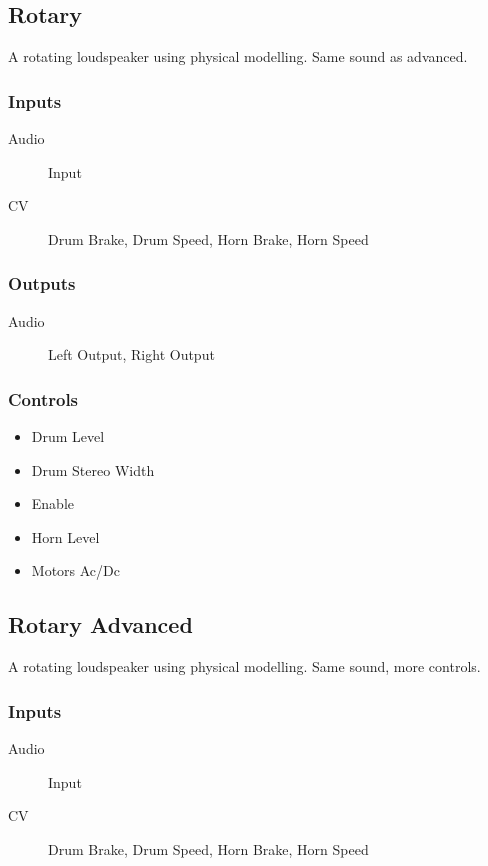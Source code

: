\subsection{Rotary}

A rotating loudspeaker using physical modelling. Same sound as advanced.



\subsubsection{Inputs}
\begin{description}
\item [Audio] Input
\item [CV] Drum Brake, Drum Speed, Horn Brake, Horn Speed
\end{description}

\subsubsection{Outputs}
\begin{description}
\item [Audio] Left Output, Right Output
\end{description}

\subsubsection{Controls}
\begin{itemize}
\item Drum Level
\item Drum Stereo Width
\item Enable
\item Horn Level
\item Motors Ac/Dc
\end{itemize}

\subsection{Rotary Advanced}

A rotating loudspeaker using physical modelling. Same sound, more controls.



\subsubsection{Inputs}
\begin{description}
\item [Audio] Input
\item [CV] Drum Brake, Drum Speed, Horn Brake, Horn Speed
\end{description}

